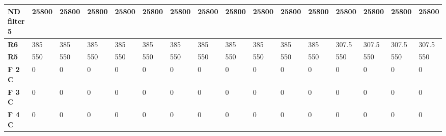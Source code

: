 \begin{footnotesize}
\begin{longtable}{|l|l|l|l|l|l|l|l|l|l|l|l|l|l|l|l|}
\textbf{ND filter 5}&25800&25800&25800&25800&25800&25800&25800&25800&25800&25800&25800&25800&25800&25800&25800\\\hline
\textbf{R6}&385&385&385&385&385&385&385&385&385&385&385&307.5&307.5&307.5&307.5\\\hline
\textbf{R5}&550&550&550&550&550&550&550&550&550&550&550&550&550&550&550\\\hline
\textbf{F 2 C}&0&0&0&0&0&0&0&0&0&0&0&0&0&0&0\\\hline
\textbf{F 3 C}&0&0&0&0&0&0&0&0&0&0&0&0&0&0&0\\\hline
\textbf{F 4 C}&0&0&0&0&0&0&0&0&0&0&0&0&0&0&0\\\hline
\end{longtable}
\end{footnotesize}